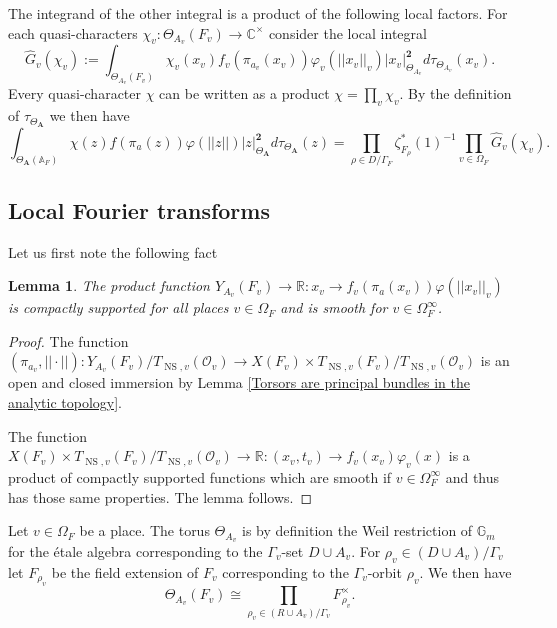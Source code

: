 \documentclass[a4paper,11pt,reqno]{amsart}
\newcommand{\R}{\mathbb{R}}
\newcommand{\C}{\mathbb{C}}
\newcommand{\G}{\mathbb{G}}
\newcommand{\A}{\mathbb{A}}
\DeclareMathOperator{\NS}{NS}
\newtheorem{lemma}[theorem]{Lemma}
\theoremstyle{definition}
\begin{document}
The integrand of the other integral is a product of the following local factors. For each quasi-characters $\chi_v: \Theta_{A_v}(F_v) \to \C^{\times}$ consider the local integral
\begin{equation*}
	\hat{G}_v(\chi_v) := \int_{\Theta_{A_v}(F_v)} \chi_v(x_v) f_v(\pi_{a_v}(x_v)) \varphi_v(||x_v||_v) |x_v|^{\mathbf{2}}_{\Theta_{A_v}} d\tau_{\Theta_{A_v}}(x_v).
\end{equation*}
Every quasi-character $\chi$ can be written as a product $\chi = \prod_v \chi_v$. By the definition of $\tau_{\Theta_{\mathbf{A}}}$ we then have
\begin{equation}\label{eq:Product of local integrals is global integral}
	\int_{\Theta_{\mathbf{A}}(\A_F)} \chi(z) f(\pi_a(z)) \varphi(||z||)|z|_{\Theta_{\mathbf{A}}}^{\mathbf{2}} d\tau_{\Theta_{\mathbf{A}}}(z) = \prod_{\rho \in D / \Gamma_F} \zeta^{*}_{F_{\rho}}(1)^{-1} \prod_{v \in \Omega_F} \hat{G}_v(\chi_v).
\end{equation}
\subsection{Local Fourier transforms}
Let us first note the following fact
\begin{lemma}
	The product function $Y_{A_v}(F_v) \to \R: x_v \to f_v(\pi_a(x_v)) \varphi(||x_v||_{v})$ is compactly supported for all places $v \in \Omega_{F}$ and is smooth for $v \in \Omega_F^{\infty}$.
	\label{Product of f and phi is compactly supported}
\end{lemma}
\begin{proof}
	The function $(\pi_{a_v}, ||\cdot||): Y_{A_v}(F_v)/T_{\NS, v}(\mathcal{O}_v) \to X(F_v) \times T_{\NS, v}(F_v)/T_{\NS, v}(\mathcal{O}_v)$ is an open and closed immersion by Lemma \ref{Torsors are principal bundles in the analytic topology}.
	
	The function $X(F_v) \times T_{\NS, v}(F_v)/T_{\NS, v}(\mathcal{O}_v) \to \R: (x_v,t_v) \to f_v(x_v) \varphi_v(x)$ is a product of compactly supported functions which are smooth if $v \in \Omega_F^{\infty}$ and thus has those same properties. The lemma follows. 
\end{proof}
Let $v \in \Omega_F$ be a place. The torus $\Theta_{A_v}$ is by definition the Weil restriction of $\G_m$ for the \'etale algebra corresponding to the $\Gamma_v$-set $D \cup A_v$. For $\rho_v \in (D \cup A_v) / \Gamma_v$ let $F_{\rho_v}$ be the field extension of $F_v$ corresponding to the $\Gamma_v$-orbit $\rho_v$. We then have
\begin{equation*}
	\Theta_{A_v}(F_v) \cong \prod_{\rho_v \in (R \cup A_v) / \Gamma_v} F_{\rho_v}^{\times}. 
\end{equation*}
\end{document}
